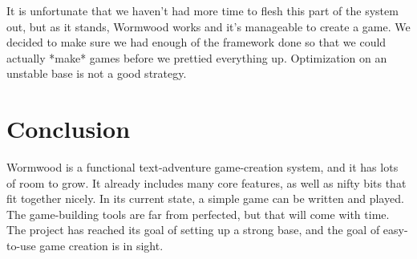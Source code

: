 \documentclass[12pt]{report}
\begin{document}
It is unfortunate that we haven't had more time to flesh this part of the 
system out, but as it stands, Wormwood works and it's manageable to create
a game. We decided to make sure we had enough of the framework done so 
that we could actually *make* games before we prettied everything up. 
Optimization on an unstable base is not a good strategy.

\section{Conclusion}
Wormwood is a functional text-adventure game-creation system, and it has lots
of room to grow. It already includes many core features, as well as nifty
bits that fit together nicely. In its current state, a simple game can be
written and played. The game-building tools are far from perfected, but
that will come with time. The project has reached its goal of setting up
a strong base, and the goal of easy-to-use game creation is in
sight.
\end{document}
